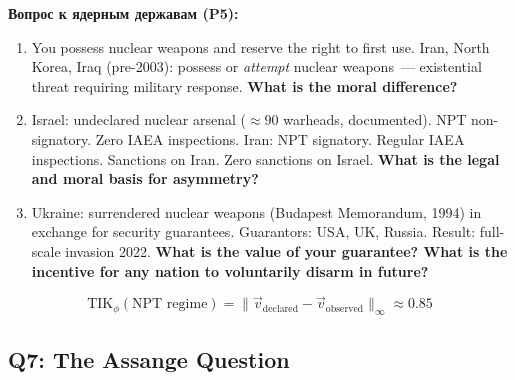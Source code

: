 \documentclass[11pt,a4paper]{article}
\theoremstyle{definition}
\theoremstyle{remark}
\newcommand{\TIKpharisee}{\text{TIK}_{\phi}}    %
\begin{document}
\begin{tcolorbox}[enhanced, breakable,
  colback=gray!5, colframe=black!60,
  title={\textbf{Q6 — Nuclear Symmetry:}
    \textit{Why is the NPT asymmetric?}},
  fonttitle=\bfseries, boxrule=1pt]

\foreignlanguage{russian}{
\textbf{Вопрос к ядерным державам (P5):}\\[0.1cm]
}
\begin{enumerate}[noitemsep, leftmargin=1.5cm]
  \item You possess nuclear weapons and reserve the right
    to first use.
    Iran, North Korea, Iraq (pre-2003): possess or \textit{attempt}
    nuclear weapons~--- existential threat requiring military response.
    \textbf{What is the moral difference?}

  \item Israel: undeclared nuclear arsenal ($\approx 90$ warheads,
    documented).
    NPT non-signatory. Zero IAEA inspections.
    Iran: NPT signatory. Regular IAEA inspections.
    Sanctions on Iran. Zero sanctions on Israel.
    \textbf{What is the legal and moral basis for asymmetry?}

  \item Ukraine: surrendered nuclear weapons (Budapest Memorandum, 1994)
    in exchange for security guarantees.
    Guarantors: USA, UK, Russia.
    Result: full-scale invasion 2022.
    \textbf{What is the value of your guarantee?
    What is the incentive for any nation to
    voluntarily disarm in future?}
\end{enumerate}

\[
  \TIKpharisee(\text{NPT regime})
  = \|\vec{v}_{\text{declared}} - \vec{v}_{\text{observed}}\|_\infty
  \approx 0.85
\]
\end{tcolorbox}

\subsection{Q7: The Assange Question}
\label{sec:q7}
\end{document}

